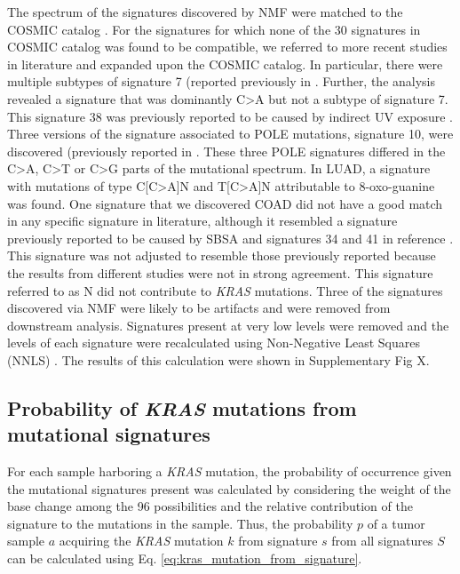 \documentclass[english, 12pt, letterpaper]{article}
\newcommand{\KRAS}{\emph{KRAS}}
\begin{document}
The spectrum of the signatures discovered by NMF were matched to the COSMIC catalog \cite{Tate2019}.
For the signatures for which none of the 30 signatures in COSMIC catalog was found to be compatible, we referred to more recent studies in literature and expanded upon the COSMIC catalog. 
In particular, there were multiple subtypes of signature 7 (reported previously in \cite{Hayward2017Whole-genomeSubtypes., Alexandrov2018TheCancer}.
Further, the analysis revealed a signature that was dominantly C>A but not a subtype of signature 7.
This signature 38 was previously reported to be caused by indirect UV exposure \cite{Alexandrov2018TheCancer}. 
Three versions of the signature associated to POLE mutations, signature 10, were discovered (previously reported in \cite{Alexandrov2018TheCancer}.
These three POLE signatures differed in the C>A, C>T or C>G parts of the mutational spectrum. 
In LUAD, a signature with mutations of type C[C>A]N and T[C>A]N attributable to 8-oxo-guanine \cite{Alexandrov2018TheCancer} was found. 
One signature that we discovered COAD did not have a good match in any specific signature in literature, although it resembled a signature previously reported to be caused by SBSA \cite{Lee-Six2019} and signatures 34 and 41 in reference \cite{Alexandrov2018TheCancer}. 
This signature was not adjusted to resemble those previously reported because the results from different studies were not in strong agreement.
This signature referred to as N did not contribute to \KRAS{} mutations.
Three of the signatures discovered via NMF were likely to be artifacts \cite{Costello2013DiscoveryPreparation.} and were removed from downstream analysis. 
Signatures present at very low levels were removed and the levels of each signature were recalculated using Non-Negative Least Squares (NNLS) \cite{Gulhan2019DetectingSamples.}.
The results of this calculation were shown in Supplementary Fig X. 


\subsection*{Probability of \KRAS{} mutations from mutational signatures}

For each sample harboring a \KRAS{} mutation, the probability of occurrence given the mutational signatures present was calculated by considering the weight of the base change among the 96 possibilities and the relative contribution of the signature to the mutations in the sample. 
Thus, the probability $p$ of a tumor sample $a$ acquiring the \KRAS{} mutation $k$ from signature $s$ from all signatures $S$ can be calculated using Eq. \ref{eq:kras_mutation_from_signature}.
\end{document}

